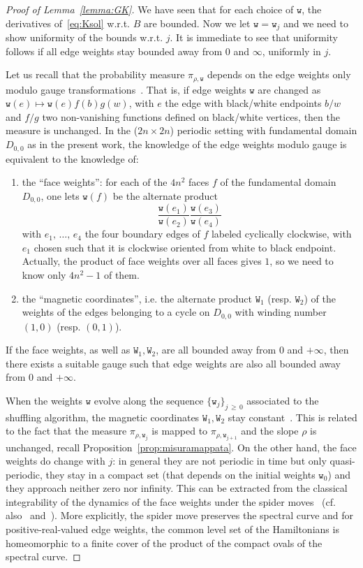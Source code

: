 \documentclass[AHL,Unicode,longabstracts,published]{cedram}
\newcommand{\ttw}{\mathtt{w}}
\newcommand{\ttW}{\mathtt{W}}
\newcommand{\ttw}{\mathtt{w}}
\begin{document}
\begin{proof}[{Proof of Lemma~\ref{lemma:GK}}]
We have seen that for each choice of $\ttw$, the derivatives of~\eqref{eq:Ksol} w.r.t. $B$ are bounded. Now we let $\ttw=\ttw_j$ and we need to show uniformity of the bounds w.r.t. $j$. It is immediate to see that uniformity follows if all edge weights stay bounded away from $0$ and $\infty$, uniformly in $j$.

Let us recall that the probability measure $\pi_{\rho,\ttw}$ depends on the edge weights only modulo gauge transformations~\cite[Section~3.2]{KenLectures}. That is, if edge weights $\ttw$ are changed as $\ttw(e)\mapsto \ttw(e) f(b)g(w)$, with $e$ the edge with black/white endpoints $b/w$ and $f/g$ two non-vanishing functions defined on black/white vertices, then the measure is unchanged. In the ($2n\times 2n$) periodic setting with fundamental domain $D_{0,0}$ as in the present work, the knowledge of the edge weights modulo gauge is equivalent to the knowledge of:
\begin{enumerate}
\item the ``face weights'': for each of the $4n^2$ faces $f$ of the fundamental domain $D_{0,0}$, one lets $\ttw(f)$ be the alternate product
\[
\frac{\ttw(e_1)}{\ttw(e_2)} \frac{\ttw(e_3)}{\ttw(e_4)}
\]
with $e_1,\,\dots,\,e_4$ the four boundary edges of $f$ labeled cyclically clockwise, with $e_1$ chosen such that it is clockwise oriented from white to black endpoint. Actually, the product of face weights over all faces gives $1$, so we need to know only $4n^2-1$ of them.
\item the ``magnetic coordinates'', i.e. the alternate product $\ttW_1$ (resp. $\ttW_2$) of the weights of the edges belonging to a cycle on $D_{0,0}$ with winding number $(1,0)$ (resp. $(0,1)$).
\end{enumerate}
If the face weights, as well as $\ttW_1,\ttW_2$, are all bounded away from $0$ and $+\infty$, then there exists a suitable gauge such that edge weights are also all bounded away from $0$ and $+\infty$.

When the weights $\ttw$ evolve along the sequence $\{\ttw_j\}_{j\,\ge\,0}$ associated to the shuffling algorithm, the magnetic coordinates $\ttW_1,\ttW_2$ stay constant~\cite{GK13}. This is related to the fact that the measure $\pi_{\rho,\ttw_j}$ is mapped to $\pi_{\rho,\ttw_{j+1}}$ and the slope $\rho$ is unchanged, recall Proposition~\ref{prop:misuramappata}. On the other hand, the face weights do change with $j$: in general they are not periodic in time but only quasi-periodic, they stay in a compact set (that depends on the initial weights $\ttw_0$) and they approach neither zero nor infinity. This can be extracted from the classical integrability of the dynamics of the face weights under the spider moves~\cite{GK13} (cf. also~\cite{fock2015inverse} and~\cite[Section~3]{Kenyon2003}). More explicitly, the spider move preserves the spectral curve and for positive-real-valued edge weights, the common level set of the Hamiltonians is homeomorphic to a finite cover of the product of the compact ovals of the spectral curve.
\end{proof}
\end{document}
